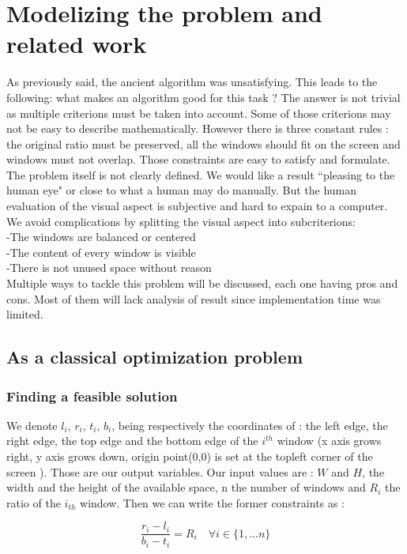 \documentclass{acmtog}
\begin{document}
\section{Modelizing the problem and related work}

As previously said, the ancient algorithm was unsatisfying. This leads to the following: what makes an algorithm good for this task ? The answer is not trivial as multiple criterions must be taken into account. Some of those criterions  may not be easy to describe mathematically. However there is three constant rules : the original ratio must be preserved, all the windows should fit on the screen and windows must not overlap. Those constraints are easy to satisfy and formulate.\\
The problem itself is not clearly defined. We would like a result ``pleasing to the human eye" or close to what a human may do manually. But the human evaluation of the visual aspect is subjective and hard to expain to a computer. We avoid complications by splitting the visual aspect into subcriterions:\\
-The windows are balanced or centered \\
-The content of every window is visible \\
-There is not unused space without reason \\
Multiple ways to tackle this problem will be discussed, each one having pros and cons. Most of them will lack analysis of result since implementation time was limited. 

\subsection{As a classical optimization problem}

\subsubsection{Finding a feasible solution}
We denote $l_i$, $r_i$, $t_i$, $b_i$, being respectively the coordinates of : the left edge, the right edge, the top edge and the bottom edge of the $i^{th}$ window (x axis grows right, y axis grows down, origin point(0,0) is set at the topleft corner of the screen ). Those are our output variables. Our input values are :  $W$ and $H$, the width and the height of the available space, n the number of windows and $R_i$ the ratio of the $i_{th}$ window. Then we can write the former constraints as :

\begin{equation}
\dfrac{r_i - l_i}{b_i - t_i} = R_i \quad \forall  i \in  \{1, ... n\}
\end{equation}
\end{document}
